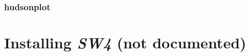 \documentclass[11pt]{report}
\begin{document}
\subsection{hudsonplot}

\appendix
\chapter{Installing \emph{SW4} (not documented)}\label{cha:installing-sw4}




\end{document}
